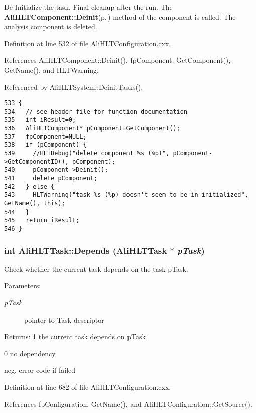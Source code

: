 De-Initialize the task. Final cleanup after the run. The {\bf Ali\-HLTComponent::Deinit}{\rm (p.\,\pageref{classAliHLTComponent_a5})} method of the component is called. The analysis component is deleted. 

Definition at line 532 of file Ali\-HLTConfiguration.cxx.

References Ali\-HLTComponent::Deinit(), fp\-Component, Get\-Component(), Get\-Name(), and HLTWarning.

Referenced by Ali\-HLTSystem::Deinit\-Tasks().

\footnotesize\begin{verbatim}533 {
534   // see header file for function documentation
535   int iResult=0;
536   AliHLTComponent* pComponent=GetComponent();
537   fpComponent=NULL;
538   if (pComponent) {
539     //HLTDebug("delete component %s (%p)", pComponent->GetComponentID(), pComponent); 
540     pComponent->Deinit();
541     delete pComponent;
542   } else {
543     HLTWarning("task %s (%p) doesn't seem to be in initialized", GetName(), this);
544   }
545   return iResult;
546 }
\end{verbatim}\normalsize 


\subsubsection{\setlength{\rightskip}{0pt plus 5cm}int Ali\-HLTTask::Depends ({\bf Ali\-HLTTask} $\ast$ {\em p\-Task})}\label{classAliHLTTask_a14}


Check whether the current task depends on the task p\-Task. \begin{Desc}
\item[Parameters:]
\begin{description}
\item[{\em p\-Task}]pointer to Task descriptor \end{description}
\end{Desc}
\begin{Desc}
\item[Returns:]1 the current task depends on p\-Task \par
 0 no dependency \par
 neg. error code if failed \end{Desc}


Definition at line 682 of file Ali\-HLTConfiguration.cxx.

References fp\-Configuration, Get\-Name(), and Ali\-HLTConfiguration::Get\-Source().

